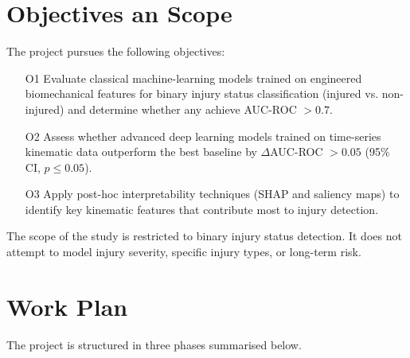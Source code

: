 \section{Objectives an Scope}\label{sec:intro-objectives-scope}




The project pursues the following objectives:
\begin{itemize}
    \item[O1] Evaluate classical machine-learning models trained on engineered biomechanical features for binary injury status classification (injured vs. non-injured) and determine whether any achieve AUC-ROC $> 0.7$.
    \item[O2] Assess whether advanced deep learning models trained on time-series kinematic data outperform the best baseline by $\Delta$AUC-ROC $> 0.05$ (95\% CI, $p \le 0.05$).
    \item[O3] Apply post-hoc interpretability techniques (SHAP and saliency maps) to identify key kinematic features that contribute most to injury detection.
\end{itemize}
The scope of the study is restricted to binary injury status detection. It does not attempt to model injury severity, specific injury types, or long-term risk.

\section{Work Plan}\label{sec:intro-work-plan}
The project is structured in three phases summarised below.
